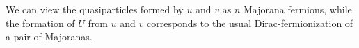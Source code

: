 \documentclass[reprint,amsmath,amssymb,aps,prl,groupedaddress,nofootinbib,superscriptaddress]{revtex4-1}
\newcommand{\1}{\mathds{1}}
\begin{document}
We can view the quasiparticles formed by $u$ and $v$ as $n$ Majorana fermions, while the formation of $U$ from $u$ and $v$ corresponds to the usual Dirac-fermionization of a pair of Majoranas.
\end{document}
